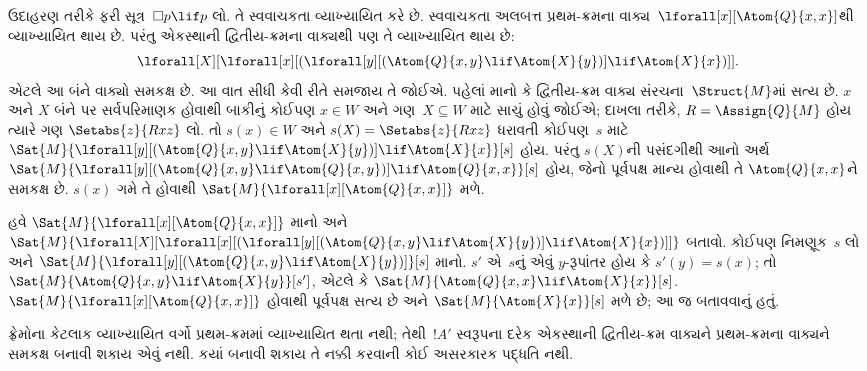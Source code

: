 ઉદાહરણ તરીકે ફરી સૂત્ર~$\Box p \lif p$ લો.
તે સ્વવાચકતા વ્યાખ્યાયિત કરે છે. સ્વવાચકતા
અલબત્ત પ્રથમ-ક્રમના વાક્ય~$\lforall[x][\Atom{Q}{x,x}]$થી
વ્યાખ્યાયિત થાય છે. પરંતુ એકસ્થાની દ્વિતીય-ક્રમના
વાક્યથી પણ તે વ્યાખ્યાયિત થાય છે:
\[
\lforall[X][\lforall[x][(\lforall[y][(\Atom{Q}{x,y} \lif \Atom{X}{y})]
    \lif \Atom{X}{x})]].
\]
એટલે આ બંને વાક્યો સમકક્ષ છે. આ વાત સીધી
કેવી રીતે સમજાય તે જોઈએ. પહેલાં માનો કે
દ્વિતીય-ક્રમ વાક્ય સંરચના~$\Struct{M}$માં
સત્ય છે. $x$ અને $X$ બંને પર સર્વપરિમાણક
હોવાથી બાકીનું કોઈપણ $x \in W$ અને
ગણ~$X \subseteq W$ માટે સાચું હોવું જોઈએ;
દાખલા તરીકે, $R =
\Assign{Q}{M}$ હોય ત્યારે ગણ
$\Setabs{z}{Rxz}$ લો. તો $s(x) \in W$ અને
$s(X) =
\Setabs{z}{Rxz}$ ધરાવતી કોઈપણ~$s$ માટે
$\Sat{M}{\lforall[y][(\Atom{Q}{x,y} \lif
    \Atom{X}{y})] \lif \Atom{X}{x}}[s]$ હોય.
પરંતુ $s(X)$ની પસંદગીથી આનો અર્થ
$\Sat{M}{\lforall[y][(\Atom{Q}{x,y} \lif
    \Atom{Q}{x,y})] \lif \Atom{Q}{x,x}}[s]$ હોય,
જેનો પૂર્વપક્ષ માન્ય હોવાથી તે
$\Atom{Q}{x,x}$ને સમકક્ષ છે. $s(x)$ ગમે તે
હોવાથી $\Sat{M}{\lforall[x][\Atom{Q}{x,x}]}$ મળે.

હવે $\Sat{M}{\lforall[x][\Atom{Q}{x,x}]}$ માનો
અને $\Sat{M}{\lforall[X][\lforall[x][(\lforall[y][(\Atom{Q}{x,y} \lif
        \Atom{X}{y})] \lif \Atom{X}{x})]]}$ બતાવો.
કોઈપણ નિમણૂક~$s$ લો અને
$\Sat{M}{\lforall[y][(\Atom{Q}{x,y} \lif
    \Atom{X}{y})]}[s]$ માનો. $s'$ એ~$s$નું એવું
$y$-રૂપાંતર હોય કે $s'(y)
= s(x)$; તો $\Sat{M}{\Atom{Q}{x,y} \lif \Atom{X}{y}}[s']$,
એટલે કે $\Sat{M}{\Atom{Q}{x,x} \lif \Atom{X}{x}}[s]$.
$\Sat{M}{\lforall[x][\Atom{Q}{x,x}]}$ હોવાથી
પૂર્વપક્ષ સત્ય છે અને $\Sat{M}{\Atom{X}{x}}[s]$
મળે છે; આ જ બતાવવાનું હતું.

ફ્રેમોના કેટલાક વ્યાખ્યાયિત વર્ગો પ્રથમ-ક્રમમાં
વ્યાખ્યાયિત થતા નથી; તેથી~$!A'$ સ્વરૂપના દરેક
એકસ્થાની દ્વિતીય-ક્રમ વાક્યને પ્રથમ-ક્રમના
વાક્યને સમકક્ષ બનાવી શકાય એવું નથી.
કયાં બનાવી શકાય તે નક્કી કરવાની કોઈ અસરકારક
પદ્ધતિ નથી.
\endgroup


\OLEndChapterHook
\endgroup


\begingroup
\makeatletter{}\makeatother

\label{guunit:OLP-0427}


\begingroup
\makeatletter{}\makeatother

